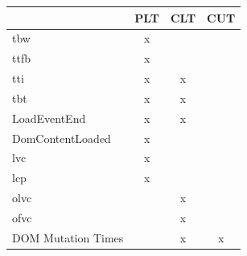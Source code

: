 \documentclass[a4paper, 12pt]{article}
\begin{document}
\begin{table}[h]
  \begin{center}
    \begin{tabular}[h]{|l|c|c|c|}
      \hline
                          & \textbf{PLT} & \textbf{CLT}  & \textbf{CUT}  \\ \hline
      \acrlong{tbw}       & x            &               &               \\ \hline
      \acrlong{ttfb}      & x            &               &               \\ \hline
      \acrlong{tti}       & x            & x             &               \\ \hline
      \acrlong{tbt}       & x            & x             &               \\ \hline
      LoadEventEnd        & x            & x             &               \\ \hline
      DomContentLoaded    & x            &               &               \\ \hline
      \acrlong{lvc}       & x            &               &               \\ \hline
      \acrlong{lcp}       & x            &               &               \\ \hline
      \acrlong{olvc}      &              & x             &               \\ \hline
      \acrlong{ofvc}      &              & x             &               \\ \hline
      DOM Mutation Times  &              & x             & x             \\ \hline
    \end{tabular}

\end{center}
\end{table}
\end{document}
